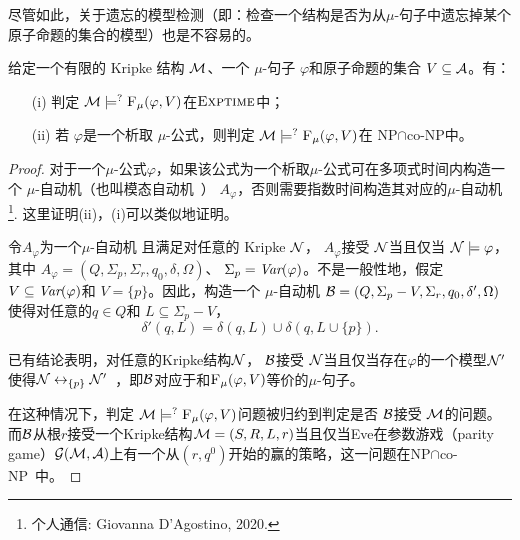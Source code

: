 尽管如此，关于遗忘的模型检测（即：检查一个结构是否为从$\mu$-句子中遗忘掉某个原子命题的集合的模型）也是不容易的。
\begin{proposition}[模型检测]\label{chapter06:pro:MC}
	给定一个有限的 Kripke 结构  ${\cal M}$、一个 $\mu$-句子 $\varphi$和原子命题的集合 $V\subseteq {\cal A}$。有：
	\begin{itemize}
		\item[(i)] 判定 ${\cal M} \models^? {\textsc{F}_{\textsc{$\mu$}}}(\varphi, V)$在$\textsc{Exptime}$中；
		\item[(ii)] 若 $\varphi$是一个析取 $\mu$-公式，则判定 ${\cal M} \models^? {\textsc{F}_{\textsc{$\mu$}}}(\varphi, V)$在 \textsc{NP}$\cap$co-\textsc{NP}中。
	\end{itemize}
\end{proposition}
\begin{proof}
	对于一个$\mu$-公式$\varphi$，如果该公式为一个析取$\mu$-公式可在多项式时间内构造一个 $\mu$-自动机（也叫模态自动机~\cite{bradfield2018mu}） $A_{\varphi}$，否则需要指数时间构造其对应的$\mu$-自动机\footnote{个人通信: Giovanna D'Agostino, 2020.}.
	这里证明(ii)，(i)可以类似地证明。
	
	令$A_{\varphi}$为一个$\mu$-自动机 且满足对任意的 Kripke ${\cal N}$， %
	$A_{\varphi}$接受 ${\cal N}$当且仅当 ${\cal N} \models \varphi$，其中 $A_{\varphi} = (Q, \Sigma_p, \Sigma_r, q_0, \delta, \Omega)$、 $\Sigma_p = \textit{Var}(\varphi)$。不是一般性地，假定$V \subseteq \textit{Var}(\varphi)$和 $V=\{p\}$。因此，构造一个 $\mu$-自动机 ${\cal B}= (Q, \Sigma_p - V, \Sigma_r, q_0, \delta', \Omega)$使得对任意的$q\in Q$和 $L\subseteq \Sigma_p - V$，
	\[
	\delta'(q, L) = \delta(q, L) \cup \delta(q, L \cup \{p\}).
	\]
	
	已有结论表明，对任意的Kripke结构${\cal N}$， ${\cal B}$接受 ${\cal N}$当且仅当存在$\varphi$的一个模型${\cal N}'$使得${\cal N} \leftrightarrow_{\{p\}} {\cal N}'$~\cite{d1996uniform}，即${\cal B}$对应于和${\textsc{F}_{\textsc{$\mu$}}}(\varphi, V)$等价的$\mu$-句子。
	
	
	在这种情况下，判定 ${\cal M} \models^? {\textsc{F}_{\textsc{$\mu$}}}(\varphi, V)$问题被归约到判定是否 ${\cal B}$接受 ${\cal M}$的问题。
	而${\cal B}$从根$r$接受一个Kripke结构${\cal M}=(S, R,L, r)$当且仅当Eve在参数游戏（parity game）${\cal G}({\cal M}, {\cal A})$上有一个从$(r,q^0)$开始的赢的策略，这一问题在\textsc{NP}$\cap$co-\textsc{NP}~\cite{bradfield2018mu}中。
\end{proof}

